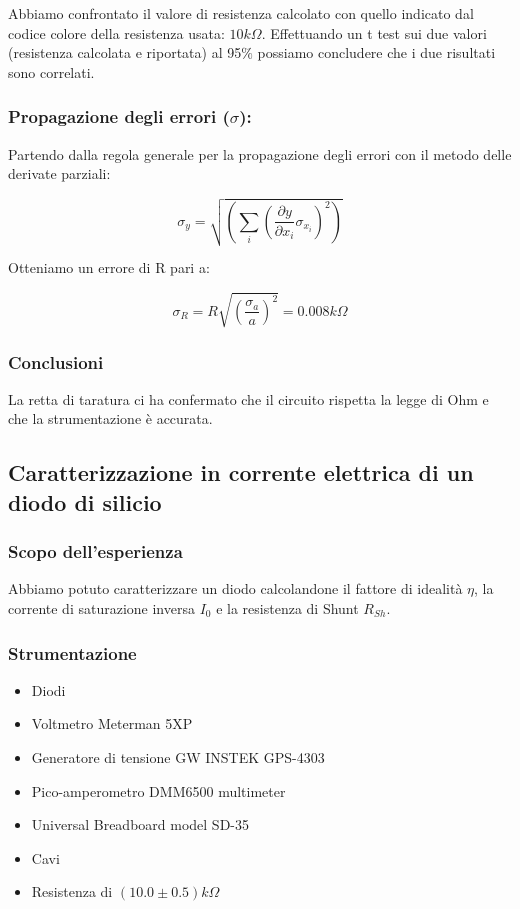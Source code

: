 \documentclass{article}
\begin{document}
Abbiamo confrontato il valore di resistenza calcolato con quello indicato dal codice colore della resistenza usata: $10 k\Omega$. Effettuando un t test sui due valori (resistenza calcolata e riportata) al 95$\%$ possiamo concludere che i due risultati sono correlati.

\subsubsection{Propagazione degli errori ($\sigma$): }

Partendo dalla regola generale per la propagazione degli errori con il metodo delle derivate parziali:

$$\sigma_y = \sqrt{\left( \sum_i \left( \frac{\partial y}{\partial x_i} \sigma_{x_i} \right) ^ 2 \right)}$$

Otteniamo un errore di R pari a:

$$\sigma_R = R\sqrt{\left(\frac{\sigma_a}{a} \right)^2} = 0.008 k\Omega$$

\subsubsection{Conclusioni}

La retta di taratura ci ha confermato che il circuito rispetta la legge di Ohm e che la strumentazione è accurata.

\newpage

\subsection{Caratterizzazione in corrente elettrica di un diodo di silicio}

\subsubsection{Scopo dell'esperienza}

Abbiamo potuto caratterizzare un diodo calcolandone il fattore di idealità $\eta$, la corrente di saturazione inversa $I_0$ e la resistenza di Shunt $R_{Sh}$.

\subsubsection{Strumentazione}

\begin{itemize}
    \item Diodi  
    \item Voltmetro Meterman 5XP
    \item Generatore di tensione GW INSTEK GPS-4303
    \item Pico-amperometro DMM6500 multimeter
    \item Universal Breadboard model SD-35
    \item Cavi
    \item Resistenza di $(10.0\pm0.5) k\Omega$
    
\end{itemize}
\end{document}
